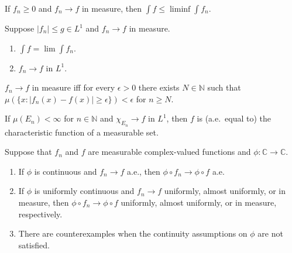 	\begin{exercise}[Folland 2.33]
		If $f_n \ge 0$ and $f_n \to f$ in measure, then $\int f \le \liminf \int f_n$.
	\end{exercise}
	\begin{solution}

	\end{solution}

	\begin{exercise}[Folland 2.34]
		Suppose $|f_n| \le g \in L^1$ and $f_n \to f$ in measure.
		\begin{enumerate}[label=\textbf{\alph*.}]
			\item $\int f = \lim \int f_n$.
			\item $f_n \to f$ in $L^1$.
		\end{enumerate}
	\end{exercise}
	\begin{solution}

	\end{solution}

	\begin{exercise}[Folland 2.35]
		$f_n \to f$ in measure iff for every $\epsilon > 0$ there exists $N \in \mathbb{N}$ such that $\mu(\{x : |f_n(x) - f(x)| \ge \epsilon\}) < \epsilon$ for $n \ge N$.
	\end{exercise}
	\begin{solution}

	\end{solution}

	\begin{exercise}[Folland 2.36]
		If $\mu(E_n) < \infty$ for $n \in \mathbb{N}$ and $\chi_{E_n} \to f$ in $L^1$, then $f$ is (a.e.\ equal to) the characteristic function of a measurable set.
	\end{exercise}
	\begin{solution}

	\end{solution}

	\begin{exercise}[Folland 2.37]
		Suppose that $f_n$ and $f$ are measurable complex-valued functions and $\phi : \mathbb{C} \to \mathbb{C}$.
		\begin{enumerate}[label=\textbf{\alph*.}]
			\item If $\phi$ is continuous and $f_n \to f$ a.e., then $\phi \circ f_n \to \phi \circ f$ a.e.
			\item If $\phi$ is uniformly continuous and $f_n \to f$ uniformly, almost uniformly, or in measure, then $\phi \circ f_n \to \phi \circ f$ uniformly, almost uniformly, or in measure, respectively.
			\item There are counterexamples when the continuity assumptions on $\phi$ are not satisfied.
		\end{enumerate}
	\end{exercise}
	\begin{solution}

	\end{solution}


